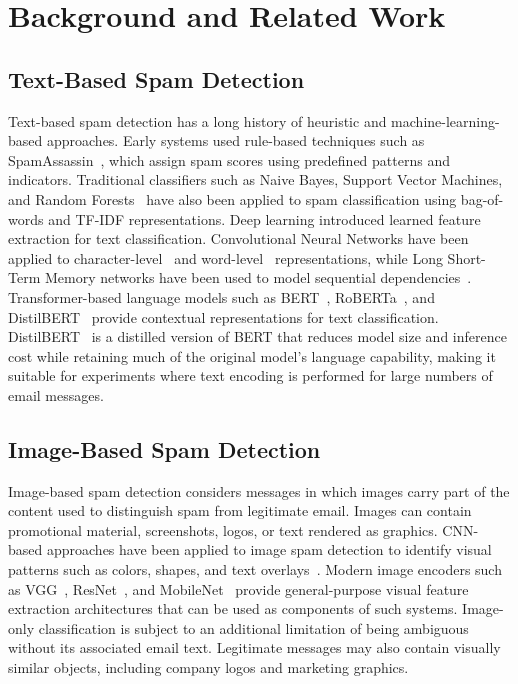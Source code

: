 \documentclass[conference]{IEEEtran}
\begin{document}
\section{Background and Related Work}
\subsection{Text-Based Spam Detection}
Text-based spam detection has a long history of heuristic and machine-learning-based approaches. Early systems used rule-based techniques such as SpamAssassin~\cite{ref1}, which assign spam scores using predefined patterns and indicators. Traditional classifiers such as Naive Bayes, Support Vector Machines, and Random Forests~\cite{ref2} have also been applied to spam classification using bag-of-words and TF-IDF representations.
Deep learning introduced learned feature extraction for text classification. Convolutional Neural Networks have been applied to character-level~\cite{ref19} and word-level~\cite{ref18} representations, while Long Short-Term Memory networks have been used to model sequential dependencies~\cite{ref20}. Transformer-based language models such as BERT~\cite{ref7}, RoBERTa~\cite{ref21}, and DistilBERT~\cite{ref4} provide contextual representations for text classification.
DistilBERT~\cite{ref4} is a distilled version of BERT that reduces model size and inference cost while retaining much of the original model's language capability, making it suitable for experiments where text encoding is performed for large numbers of email messages.
\subsection{Image-Based Spam Detection}
Image-based spam detection considers messages in which images carry part of the content used to distinguish spam from legitimate email. Images can contain promotional material, screenshots, logos, or text rendered as graphics.
CNN-based approaches have been applied to image spam detection to identify visual patterns such as colors, shapes, and text overlays~\cite{ref24}. Modern image encoders such as VGG~\cite{ref15}, ResNet~\cite{ref16}, and MobileNet~\cite{ref17} provide general-purpose visual feature extraction architectures that can be used as components of such systems.
Image-only classification is subject to an additional limitation of being ambiguous without its associated email text. Legitimate messages may also contain visually similar objects, including company logos and marketing graphics.
\end{document}
